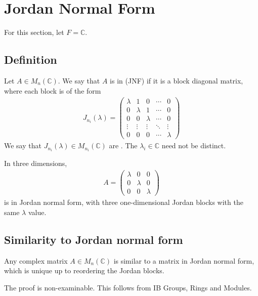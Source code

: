 \section{Jordan Normal Form}

For this section, let $F = \mathbb C$.

\subsection{Definition}
\begin{definition}
	Let $A \in M_n(\mathbb C)$.
	We say that $A$ is in  (JNF) if it is a block diagonal matrix, where each block is of the form
	\begin{align*}
		J_{n_i}(\lambda) =
		\begin{pmatrix}
			\lambda & 1       & 0       & \cdots & 0       \\
			0       & \lambda & 1       & \cdots & 0       \\
			0       & 0       & \lambda & \cdots & 0       \\
			\vdots  & \vdots  & \vdots  & \ddots & \vdots  \\
			0       & 0       & 0       & \cdots & \lambda
		\end{pmatrix}
	\end{align*}
	We say that $J_{n_i}(\lambda) \in M_{n_i}(\mathbb C)$ are .
	The $\lambda_i \in \mathbb C$ need not be distinct.
\end{definition}
\begin{remark}
	In three dimensions,
	\begin{align*}
		A =
		\begin{pmatrix}
			\lambda & 0       & 0       \\
			0       & \lambda & 0       \\
			0       & 0       & \lambda
		\end{pmatrix}
	\end{align*}
	is in Jordan normal form, with three one-dimensional Jordan blocks with the same $\lambda$ value.
\end{remark}

\subsection{Similarity to Jordan normal form}
\begin{theorem}
	Any complex matrix $A \in M_n(\mathbb C)$ is similar to a matrix in Jordan normal form, which is unique up to reordering the Jordan blocks.
\end{theorem}
The proof is non-examinable.
This follows from IB Groups, Rings and Modules.

